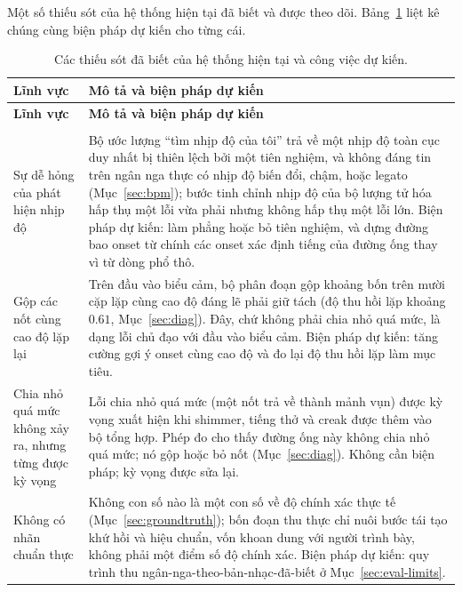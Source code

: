 \documentclass[12pt,a4paper]{article}
\begin{document}
Một số thiếu sót của hệ thống hiện tại đã biết và được theo dõi.
Bảng~\ref{tab:deficiencies} liệt kê chúng cùng biện pháp dự kiến cho từng cái.

\begin{longtable}{>{\raggedright\arraybackslash}p{} >{\raggedright\arraybackslash}p{}}
\caption{Các thiếu sót đã biết của hệ thống hiện tại và công việc dự kiến.}
\label{tab:deficiencies} \\
\toprule
\textbf{Lĩnh vực} & \textbf{Mô tả và biện pháp dự kiến} \\
\midrule
\endfirsthead
\toprule
\textbf{Lĩnh vực} & \textbf{Mô tả và biện pháp dự kiến} \\
\midrule
\endhead
\midrule
\multicolumn{2}{r}{\footnotesize\itshape Tiếp tục ở trang sau.} \\
\endfoot
\bottomrule
\endlastfoot
Sự dễ hỏng của phát hiện nhịp độ & Bộ ước lượng ``tìm nhịp độ của tôi'' trả về một
nhịp độ toàn cục duy nhất bị thiên lệch bởi một tiên nghiệm, và không đáng tin trên
ngân nga thực có nhịp độ biến đổi, chậm, hoặc legato (Mục~\ref{sec:bpm}); bước tinh
chỉnh nhịp độ của bộ lượng tử hóa hấp thụ một lỗi vừa phải nhưng không hấp thụ một
lỗi lớn. Biện pháp dự kiến: làm phẳng hoặc bỏ tiên nghiệm, và dựng đường bao onset
từ chính các onset xác định tiếng của đường ống thay vì từ dòng phổ thô. \\
\addlinespace
Gộp các nốt cùng cao độ lặp lại & Trên đầu vào biểu cảm, bộ phân đoạn gộp khoảng bốn
trên mười cặp lặp cùng cao độ đáng lẽ phải giữ tách (độ thu hồi lặp khoảng $0.61$,
Mục~\ref{sec:diag}). Đây, chứ không phải chia nhỏ quá mức, là dạng lỗi chủ đạo với
đầu vào biểu cảm. Biện pháp dự kiến: tăng cường gợi ý onset cùng cao độ và đo lại độ
thu hồi lặp làm mục tiêu. \\
\addlinespace
Chia nhỏ quá mức không xảy ra, nhưng từng được kỳ vọng & Lỗi chia nhỏ quá mức (một
nốt trả về thành mảnh vụn) được kỳ vọng xuất hiện khi shimmer, tiếng thở và creak
được thêm vào bộ tổng hợp. Phép đo cho thấy đường ống này không chia nhỏ quá mức; nó
gộp hoặc bỏ nốt (Mục~\ref{sec:diag}). Không cần biện pháp; kỳ vọng được sửa lại. \\
\addlinespace
Không có nhãn chuẩn thực & Không con số nào là một con số về độ chính xác thực tế
(Mục~\ref{sec:groundtruth}); bốn đoạn thu thực chỉ nuôi bước tái tạo khứ hồi và hiệu
chuẩn, vốn khoan dung với người trình bày, không phải một điểm số độ chính xác. Biện
pháp dự kiến: quy trình thu ngân-nga-theo-bản-nhạc-đã-biết ở
Mục~\ref{sec:eval-limits}. \\

\end{longtable}
\end{document}
